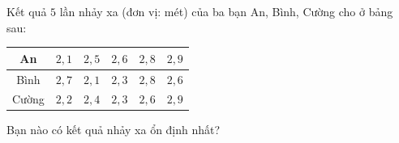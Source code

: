 \begin{ex}
Kết quả $5$ lần nhảy xa (đơn vị: mét) của ba bạn An, Bình, Cường cho ở bảng sau:
\begin{center}
\begin{tabular}{|c|c|c|c|c|c|}\hline
An & $2{,}1$ & $2{,}5$ & $2{,}6$ & $2{,}8$ & $2{,}9$\\\hline
Bình & $2{,}7$ & $2{,}1$ & $2{,}3$ & $2{,}8$ & $2{,}6$\\\hline
Cường & $2{,}2$ & $2{,}4$ & $2{,}3$ & $2{,}6$ & $2{,}9$\\\hline
\end{tabular}
\end{center}
Bạn nào có kết quả nhảy xa ổn định nhất?
\end{ex}
